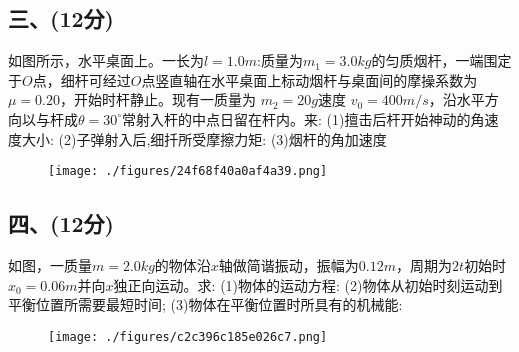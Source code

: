 \subsection{三、(12分)}
如图所示，水平桌面上。一长为$l = 1.0m$:质量为$m_1 = 3.0kg$的匀质烟杆，一端围定于$O$点，细杆可经过$O$点竖直轴在水平桌面上标动烟杆与桌面间的摩操系数为$\mu=0.20$，开始时杆静止。现有一质量为 $m_2 = 20g$速度 $v_0 = 400m/s$，沿水平方向以与杆成$\theta = 30^\circ$常射入杆的中点日留在杆内。来:
(1)擅击后杆开始神动的角速度大小:
(2)子弹射入后,细扦所受摩擦力矩:
(3)烟杆的角加速度
\begin{figure}[ht]
\centering
\texttt{[image: ./figures/24f68f40a0af4a39.png]}
\caption{} \label{fig_NJU10_5}
\end{figure}
\subsection{四、(12分)}
如图，一质量$m=2.0kg$的物体沿$x$轴做简谐振动，振幅为$0.12m$，周期为$2t$初始时$x_0=0.06m$并向$x$独正向运动。求:
(1)物体的运动方程:
(2)物体从初始时刻运动到平衡位置所需要最短时间;
(3)物体在平衡位置时所具有的机械能:
\begin{figure}[ht]
\centering
\texttt{[image: ./figures/c2c396c185e026c7.png]}
\caption{} \label{fig_NJU10_6}
\end{figure}